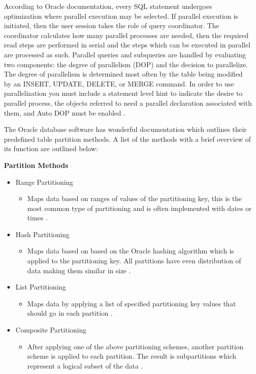 \documentclass[draftclsnofoot, onecolumn, compsoc, 10pt]{IEEEtran}
\begin{document}
According to Oracle documentation, every SQL statement undergoes optimization where parallel execution may be selected. If parallel execution  is initiated, then the user session takes the role of query coordinator.
The coordinator calculates how many parallel processes are needed, then the required read steps are performed in serial and the steps which can be executed in parallel are processed as such.
Parallel queries and subqueries are handled by evaluating two components: the degree of parallelism (DOP) and the decision to parallelize.
The degree of parallelism is determined most often by the table being modified by an INSERT, UPDATE, DELETE, or MERGE command.
In order to use parallelization you must include a statement level hint to indicate the desire to parallel process, the objects referred to need a parallel declaration associated with them, and Auto DOP must be enabled \cite{How Parallel Execution Works}.

The Oracle database software has wonderful documentation which outlines their predefined table partition methods. A list of the methods with a brief overview of its function are outlined below:

\textbf{Partition Methods}
\begin{itemize} 
	\item  Range Partitioning
    \begin{itemize} 
		\item Maps data based on ranges of values of the partitioning key, this is the most common type of partitioning and is often implemented with dates or times \cite{Partitioning Concepts}.
    \end{itemize}
    \item Hash Partitioning
    \begin{itemize} 
		\item Maps data based on based on the Oracle hashing algorithm which is applied to the partitioning key.
        All partitions have even distribution of data making them similar in size \cite{Partitioning Concepts}.
    \end{itemize}
    \item List Partitioning
    \begin{itemize} 
		\item Maps data by applying a list of specified partitioning key values that should go in each partition \cite{Partitioning Concepts}.
    \end{itemize}
    \item Composite Partitioning
    \begin{itemize} 
		\item After applying one of the above partitioning schemes, another partition scheme is applied to each partition.
        The result is subpartitions which represent a logical subset of the data \cite{Partitioning Concepts}.
    \end{itemize}
\end{itemize}
\end{document}
